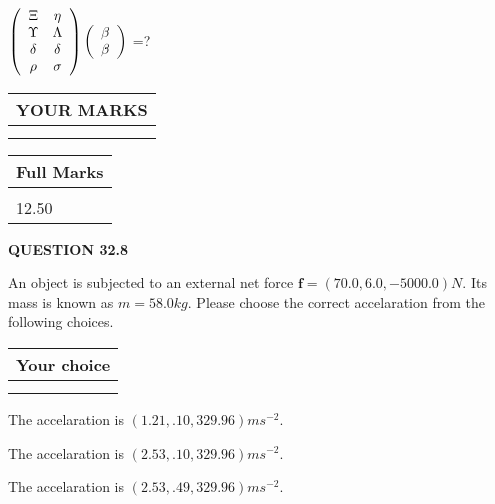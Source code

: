 \documentclass[12pt]{article}
\begin{document}
 
$  %
 \left( \begin{array}
 {
 c
 c
 }
                    \Xi & 
 \eta \\ 
 \Upsilon & 
 \Lambda \\ 
 \delta & 
 \delta \\ 
 \rho & 
 \sigma
 \end{array} \right)
 \left( \begin{array}
 {
 c
 }
 \beta \\ 
 \beta
 \end{array} \right)
$ =?
 

 

 
\vspace{0.3in}
  
\vspace{0.2in}
  
\noindent\begin{tabular}{|l|}
\hline
 YOUR MARKS  \\
\hline
 \\ 
 \\ 
\hline
\end{tabular}
\hspace{0.05in} \begin{tabular}{|l|}
\hline
 Full Marks  \\
\hline
 \\ 
12.50 \\
\hline
\end{tabular}
{\textbf{\Large{QUESTION
32.8 
}}}
  
  
 
An object is subjected to an external net force $\mathbf{f}=
(70.0 , 6.0 , -5000.0) N$.
Its mass is known as $m= %
58.0 kg$.
Please choose the correct accelaration from the following choices.
  
  
\noindent\hspace{3.0in} \begin{tabular}{|l|}
\hline
Your choice \\
\hline
 \\ 
 \\ 
\hline
\end{tabular}
  
  
 
 
  The accelaration is $  %
(
1.21,
.10,
329.96)
ms^{-2} $.
 
 
  The accelaration is $  %
(
2.53,
.10,
329.96)
ms^{-2} $.
 
 
  The accelaration is $  %
(
2.53,
.49,
329.96)
ms^{-2} $.
 
\end{document}
